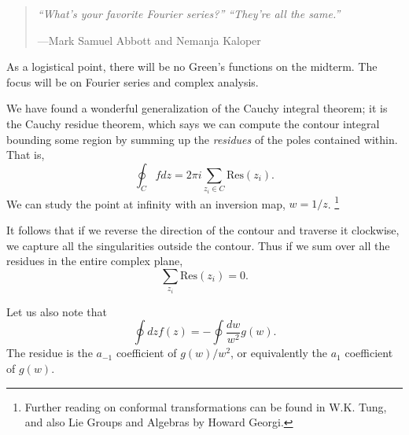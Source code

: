 \begin{quote}
    \textit{``What's your favorite Fourier series?'' ``They're all the same.''}
    
    ---Mark Samuel Abbott and Nemanja Kaloper
\end{quote}

\begin{note}
    As a logistical point, there will be no Green's functions on the midterm. The focus will be on Fourier series and complex analysis.
\end{note}

We have found a wonderful generalization of the Cauchy integral theorem; it is the Cauchy residue theorem, which says we can compute the contour integral bounding some region by summing up the \emph{residues} of the poles contained within. That is,
\begin{equation}
    \oint_C f dz = 2\pi i \sum_{z_i \in C} \text{Res}(z_i).
\end{equation}
We can study the point at infinity with an inversion map, $w=1/z$.%
    \footnote{Further reading on conformal transformations can be found in W.K. Tung, and also Lie Groups and Algebras by Howard Georgi.}

It follows that if we reverse the direction of the contour and traverse it clockwise, we capture all the singularities outside the contour. Thus if we sum over all the residues in the entire complex plane,
\begin{equation}
    \sum_{z_i} \text{Res}(z_i) =0.
\end{equation}

Let us also note that
\begin{equation}
    \oint dz f(z) = -\oint \frac{dw}{w^2} g(w).
\end{equation}
The residue is the $a_{-1}$ coefficient of $g(w)/w^2$, or equivalently the $a_1$ coefficient of $g(w)$.

